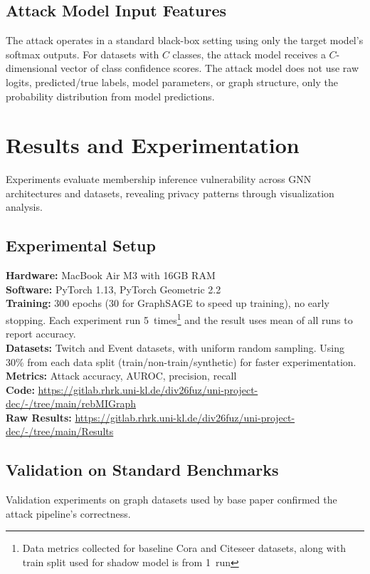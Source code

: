 \documentclass{article}
\begin{document}
\subsection{Attack Model Input Features}
The attack operates in a standard black-box setting using only the target model's softmax outputs. For datasets with $C$ classes, the attack model receives a $C$-dimensional vector of class confidence scores. The attack model does not use raw logits, predicted/true labels, model parameters, or graph structure, only the probability distribution from model predictions.

\section{Results and Experimentation}
\label{results}
Experiments evaluate membership inference vulnerability across GNN architectures and datasets, revealing privacy patterns through visualization analysis.

\subsection{Experimental Setup}
\textbf{Hardware:} MacBook Air M3 with 16GB RAM\\
\textbf{Software:} PyTorch 1.13, PyTorch Geometric 2.2\\
\textbf{Training:} 300 epochs (30 for GraphSAGE to speed up training), no early stopping. Each experiment run 5~times\footnote{Data metrics collected for baseline Cora and Citeseer datasets, along with train split used for shadow model is from 1~run} and the result uses mean of all runs to report accuracy.\\
\textbf{Datasets:} Twitch and Event datasets, with uniform random sampling. Using 30\% from each data split (train/non-train/synthetic) for faster experimentation.\\
\textbf{Metrics:} Attack accuracy, AUROC, precision, recall\\
\textbf{Code:} \url{https://gitlab.rhrk.uni-kl.de/div26fuz/uni-project-dec/-/tree/main/rebMIGraph} \\
\textbf{Raw Results:} \url{https://gitlab.rhrk.uni-kl.de/div26fuz/uni-project-dec/-/tree/main/Results}

\subsection{Validation on Standard Benchmarks}
Validation experiments on graph datasets used by base paper \cite{olatunji2021membershipinferenceattackgraph} confirmed the attack pipeline's correctness.
\end{document}
